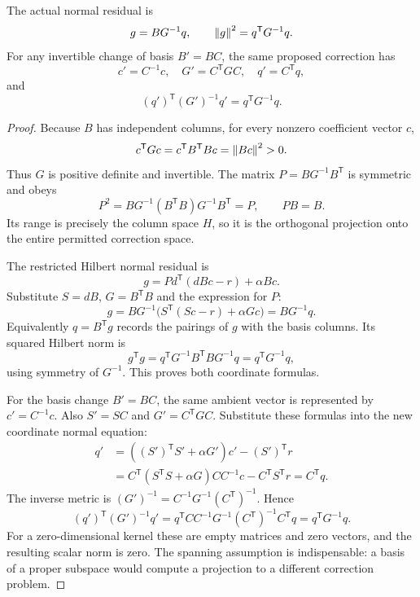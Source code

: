 \begin{KSproposition}\label{KS:WR15}
The actual normal residual is
\begin{equation}\label{KS:eq:covector-norm}
 g=BG^{-1}q,\qquad \left\lVert g\right\rVert^2=q^{\mathsf T}G^{-1}q.
\end{equation}
For any invertible change of basis $B'=BC$, the same proposed correction has
\[
 c'=C^{-1}c,\quad G'=C^{\mathsf T}GC,\quad q'=C^{\mathsf T}q,
\]
and
\[
 (q')^{\mathsf T}(G')^{-1}q'=q^{\mathsf T}G^{-1}q.
\]
\end{KSproposition}
\begin{proof}
Because $B$ has independent columns, for every nonzero coefficient vector $c$,
\[
 c^{\mathsf T}Gc=c^{\mathsf T}B^{\mathsf T}Bc=\left\lVert Bc\right\rVert^2>0.
\]
Thus $G$ is positive definite and invertible. The matrix $P=BG^{-1}B^{\mathsf T}$ is symmetric and obeys
\[
 P^2=BG^{-1}(B^{\mathsf T}B)G^{-1}B^{\mathsf T}=P,
 \qquad PB=B.
\]
Its range is precisely the column space $H$, so it is the orthogonal projection onto the entire permitted correction space.

The restricted Hilbert normal residual is
\[
 g=P d^{\mathsf T}(dBc-r)+\alpha Bc.
\]
Substitute $S=dB$, $G=B^{\mathsf T}B$ and the expression for $P$:
\[
 g=BG^{-1}\bigl(S^{\mathsf T}(Sc-r)+\alpha Gc\bigr)=BG^{-1}q.
\]
Equivalently $q=B^{\mathsf T}g$ records the pairings of $g$ with the basis columns. Its squared Hilbert norm is
\[
 g^{\mathsf T}g
 =q^{\mathsf T}G^{-1}B^{\mathsf T}BG^{-1}q
 =q^{\mathsf T}G^{-1}q,
\]
using symmetry of $G^{-1}$. This proves both coordinate formulas.

For the basis change $B'=BC$, the same ambient vector is represented by $c'=C^{-1}c$. Also $S'=SC$ and $G'=C^{\mathsf T}GC$. Substitute these formulas into the new coordinate normal equation:
\[
\begin{aligned}
 q'&=((S')^{\mathsf T}S'+\alpha G')c'-(S')^{\mathsf T}r\\
 &=C^{\mathsf T}(S^{\mathsf T}S+\alpha G)CC^{-1}c
      -C^{\mathsf T}S^{\mathsf T}r=C^{\mathsf T}q.
\end{aligned}
\]
The inverse metric is $(G')^{-1}=C^{-1}G^{-1}(C^{\mathsf T})^{-1}$. Hence
\[
 (q')^{\mathsf T}(G')^{-1}q'
 =q^{\mathsf T}C C^{-1}G^{-1}(C^{\mathsf T})^{-1}C^{\mathsf T}q
 =q^{\mathsf T}G^{-1}q.
\]
For a zero-dimensional kernel these are empty matrices and zero vectors, and the resulting scalar norm is zero. The spanning assumption is indispensable: a basis of a proper subspace would compute a projection to a different correction problem.
\end{proof}

